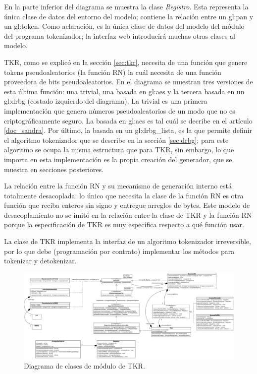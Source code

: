 En la parte inferior del diagrama se muestra la clase \textit{Registro}. Esta
representa la única clase de datos del entorno del modelo; contiene la relación
entre un \gls{gl:pan} y un \gls{gl:token}. Como aclaración, es la única clase de
datos del modelo del módulo del programa tokenizador; la interfaz web
introducirá muchas otras clases al modelo.

TKR, como se explicó en la sección \ref{sec:tkr}, necesita de una función que
genere tokens pseudoaleatorios (la función RN) la cuál necesita de una función
proveedora de bits pseudoaleatorios. En el diagrama se muestran tres versiones
de esta última función: una trivial, una basada en \gls{gl:aes} y la tercera
basada en un \gls{gl:drbg} (costado izquierdo del diagrama). La trivial es una
primera implementación que genera números pseudoaleatorios de un modo que no es
criptográficamente seguro. La basada en \gls{gl:aes} es tal cuál se decribe en
el artículo \ref{doc_sandra}. Por último, la basada en un \gls{gl:drbg_lista},
es la que permite definir el algoritmo tokenizador que se describe en la sección
\ref{sec:drbg}; para este algoritmo se ocupa la misma estructura que para TKR,
sin embargo, lo que importa en esta implementación es la propia creación del
generador, que se muestra en secciones posteriores.

La relación entre la función RN y su mecanismo de generación interno está
totalmente desacoplada: lo único que necesita la clase de la función RN es otra
función que reciba enteros sin signo y entregue arreglos de bytes. Este modelo
de desacoplamiento no se imitó en la relación entre la clase de TKR y la función
RN porque la especificación de TKR es muy específica respecto a qué función
usar.

La clase de TKR implementa la interfaz de un algoritmo tokenizador irreversible,
por lo que debe (programación por contrato) implementar los métodos para
tokenizar y detokenizar.

\begin{figure}
  \begin{center}
    \includegraphics[width=1.0\linewidth]{diagramas/tkr.png}
    \caption{Diagrama de clases de módulo de TKR.}
    \label{clases_tkr}
  \end{center}
\end{figure}


